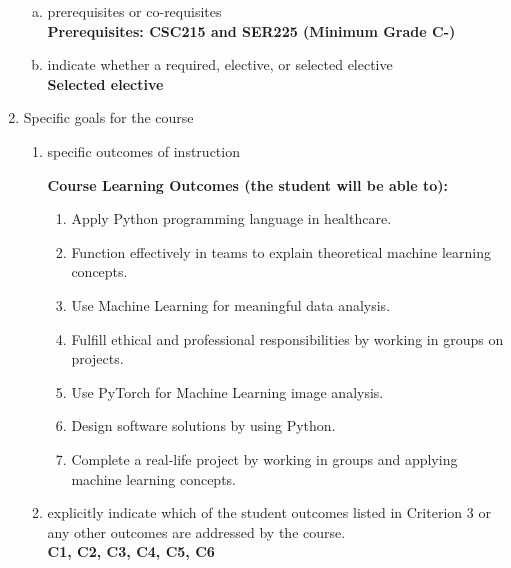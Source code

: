 \begin{enumerate}[1.]
\begin{enumerate}[a.]
\item prerequisites or co-requisites\\
  {\bfseries
    Prerequisites: CSC215 and SER225 (Minimum Grade C-)
  }

\item indicate whether a required, elective, or selected elective\\ %
  {\bfseries
    Selected elective
  }

\end{enumerate}

\item Specific goals for the course
\begin{enumerate}
\item specific outcomes of instruction\\ %
  {\bfseries
    Course Learning Outcomes (the student will be able to):
\begin{enumerate}
\item Apply Python programming language in healthcare.
\item Function effectively in teams to explain theoretical machine learning concepts.
\item Use Machine Learning for meaningful data analysis.
\item Fulfill ethical and professional responsibilities by working in groups on projects.
\item Use PyTorch for Machine Learning image analysis.
\item Design software solutions by using Python.
\item Complete a real-life project by working in groups and applying machine learning concepts.
\end{enumerate}
  }

\item explicitly indicate which of the student outcomes listed in Criterion 3 or any other outcomes are addressed by the course.\\
  {\bfseries
    C1,
    C2,
    C3,
    C4,
    C5,
    C6
  }
\end{enumerate}


\end{enumerate}
